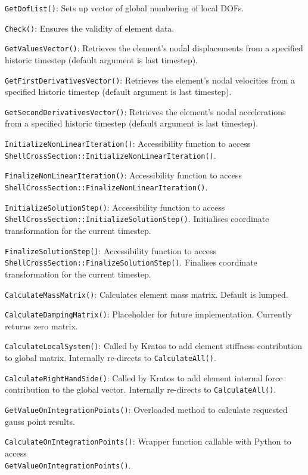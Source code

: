 \texttt{GetDofList()}: Sets up vector of global numbering of local DOFs.

\texttt{Check()}: Ensures the validity of element data.

\texttt{GetValuesVector()}: Retrieves the element's nodal displacements from a specified historic timestep (default argument is last timestep).

\texttt{GetFirstDerivativesVector()}: Retrieves the element's nodal velocities from a specified historic timestep (default argument is last timestep).

\texttt{GetSecondDerivativesVector()}: Retrieves the element's nodal accelerations from a specified historic timestep (default argument is last timestep).

\texttt{InitializeNonLinearIteration()}: Accessibility function to access \\ \texttt{ShellCrossSection::InitializeNonLinearIteration()}.

\texttt{FinalizeNonLinearIteration()}: Accessibility function to access \\ \texttt{ShellCrossSection::FinalizeNonLinearIteration()}.

\texttt{InitializeSolutionStep()}: Accessibility function to access \\ \texttt{ShellCrossSection::InitializeSolutionStep()}. Initialises coordinate transformation for the current timestep.

\texttt{FinalizeSolutionStep()}: Accessibility function to access \\ \texttt{ShellCrossSection::FinalizeSolutionStep()}. Finalises coordinate transformation for the current timestep.

\texttt{CalculateMassMatrix()}: Calculates element mass matrix. Default is lumped.

\texttt{CalculateDampingMatrix()}: Placeholder for future implementation. Currently returns zero matrix.

\texttt{CalculateLocalSystem()}: Called by Kratos to add element stiffness contribution to global matrix. Internally re-directs to \texttt{CalculateAll()}.

\texttt{CalculateRightHandSide()}: Called by Kratos to add element internal force contribution to the global vector. Internally re-directs to \texttt{CalculateAll()}.

\texttt{GetValueOnIntegrationPoints()}: Overloaded method to calculate requested gauss point results.

\texttt{CalculateOnIntegrationPoints()}: Wrapper function callable with Python to access \\ \texttt{GetValueOnIntegrationPoints()}.

